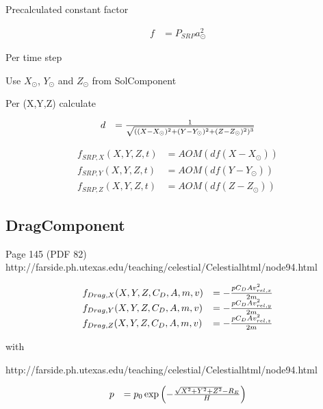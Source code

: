 \documentclass{article}
\begin{document}
Precalculated constant factor

\begin{equation}
\begin{array}{ll}
f &= P_{SRP}a_\odot^2
\end{array}
\end{equation}

Per time step

Use \(X_{\odot}\), \(Y_{\odot}\) and \(Z_{\odot}\) from SolComponent

Per (X,Y,Z) calculate

\begin{equation}
\begin{array}{ll}
d &= {1 \over \sqrt{((X-X_\odot)^2+(Y-Y_\odot)^2+(Z-Z_\odot)^2)^3}}
\end{array}
\end{equation}

\begin{equation}
\begin{array}{ll}
f_{SRP,X}(X,Y,Z,t) &=AOM(df(X-X_{\odot})) \\
f_{SRP,Y}(X,Y,Z,t) &=AOM(df(Y-Y_{\odot})) \\
f_{SRP,Z}(X,Y,Z,t) &=AOM(df(Z-Z_{\odot}))
\end{array}
\end{equation}

\subsection{DragComponent}
Page 145 (PDF 82) http://farside.ph.utexas.edu/teaching/celestial/Celestialhtml/node94.html

\begin{equation}
\begin{array}{ll}
f_{Drag,X}(X,Y,Z,C_D,A,m,v) &= -{{pC_DAv_{rel,x}^2} \over {2m}} \\
f_{Drag,Y}(X,Y,Z,C_D,A,m,v) &= -{{pC_DAv_{rel,y}^2} \over {2m}} \\
f_{Drag,Z}(X,Y,Z,C_D,A,m,v) &= -{{pC_DAv_{rel,z}^2} \over {2m}}
\end{array}
\end{equation}

with

http://farside.ph.utexas.edu/teaching/celestial/Celestialhtml/node94.html

\begin{equation}
\begin{array}{ll}
p &= p_0\exp\left(-{{\sqrt{X^2+Y^2+Z^2} - R_E} \over H}\right)
\end{array}
\end{equation}
\end{document}
